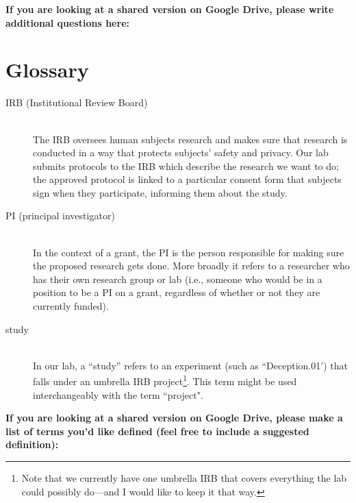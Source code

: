 \documentclass[letterpaper,12pt,oneside]{memoir}
\begin{document}
\vspace{.2in}
\noindent \textbf{\large If you are looking at a shared version on Google Drive, please write additional questions here:}


%

\chapter{Glossary}

\begin{description}

\item[IRB (Institutional Review Board)] \hfill \\
The IRB oversees human subjects research and makes sure that research is conducted in a way that protects subjects' safety and privacy. Our lab submits protocols to the IRB which describe the research we want to do; the approved protocol is linked to a particular consent form that subjects sign when they participate, informing them about the study.

\item[PI (principal investigator)] \hfill \\
In the context of a grant, the PI is the person responsible for making sure the proposed research gets done. More broadly it refers to a researcher who has their own research group or lab (i.e., someone who would be in a position to be a PI on a grant, regardless of whether or not they are currently funded).

\item[study] \hfill \\
In our lab, a ``study'' refers to an experiment (such as ``Deception.01') that falls under an umbrella IRB project\footnote{Note that we currently have one umbrella IRB that covers everything the lab could possibly do---and I would like to keep it that way.}. This term might be used interchangeably with the term ``project". 

\end{description}

\vspace{.2in}
\noindent \textbf{\large If you are looking at a shared version on Google Drive, please make a list of terms you'd like defined (feel free to include a suggested definition):}



%
%
\end{document}
